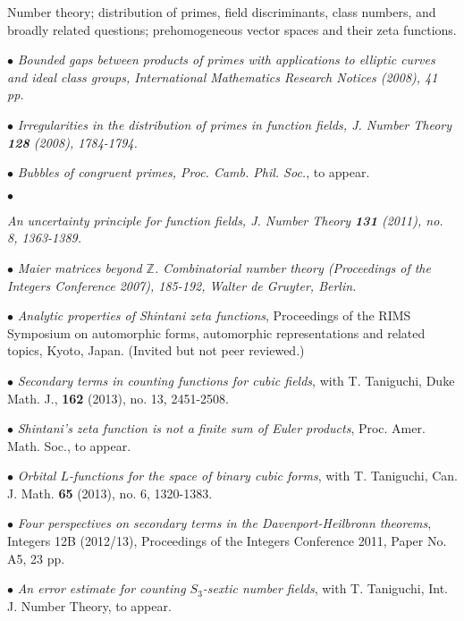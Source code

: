 \documentclass{article}
\newcommand{\categorywidth}{1in}        %
\newcommand{\infowidth}{5.8in}          %
\newcommand{\categorysep}{5pt}
\newcommand{\catlistlabel}[1]%
{\raisebox{0pt}[1ex][0pt]{\makebox[\labelwidth][l]%
    {\parbox[t]{\labelwidth}{\hspace{0pt}\textbf{#1}}}}}
\newenvironment{categories}{\begin{list}{}{
      \setlength{\labelwidth}{\categorywidth}
      \setlength{\leftmargin}{\labelwidth}
      \addtolength{\leftmargin}{\labelsep}
      \setlength{\topsep}{20pt}
      \setlength{\itemsep}{\categorysep}
      \renewcommand{\makelabel}{\catlistlabel}
      }}{\end{list}}
\newcommand{\category}[1]{\item[#1]}
\newcommand{\rawentry}[1]{{\begin{minipage}[t]{\infowidth}{#1}
    \end{minipage}}}
\begin{document}
\begin{flushleft}
\begin{categories}
  \rawentry{Number theory; distribution of primes, field discriminants, class numbers, 
  and broadly related questions; prehomogeneous vector spaces and their zeta functions. \\}





  \category{Research \\ Publications}

  $\bullet$ {\itshape Bounded gaps between products of primes with applications
to elliptic curves and ideal class groups\upshape, International Mathematics
Research Notices (2008), 41 pp.}

  $\bullet$ {\itshape Irregularities in the distribution of primes in function fields\upshape, 
   J. Number Theory \textbf{128} (2008), 1784-1794.}

  $\bullet$ {\itshape Bubbles of congruent primes\upshape,
  Proc. Camb. Phil. Soc.}, to appear.

  $\bullet$ {\itshape An uncertainty principle for function fields\upshape,
J. Number Theory \textbf{131} (2011), no. 8, 1363-1389. 

  $\bullet$ {\itshape Maier matrices beyond $\mathbb{Z}$\upshape.
Combinatorial number theory
(Proceedings of the Integers Conference 2007), 185-192, Walter de Gruyter, Berlin.}

  $\bullet$ {\itshape Analytic properties of Shintani zeta functions}, Proceedings
of the RIMS Symposium on automorphic forms, automorphic representations and related topics, Kyoto, Japan.
(Invited but not peer reviewed.)

  $\bullet$ {\itshape Secondary terms in counting functions for cubic fields}, with T. Taniguchi, Duke Math. J., 
\textbf{162} (2013), no. 13, 2451-2508.

  $\bullet$ {\itshape Shintani's zeta function is not a finite sum of Euler products},
Proc. Amer. Math. Soc., to appear.

  $\bullet$ {\itshape Orbital $L$-functions for the space of binary cubic forms}, with T. Taniguchi,
Can. J. Math. \textbf{65} (2013), no. 6, 1320-1383.

  $\bullet$ {\itshape Four perspectives on secondary terms in the Davenport-Heilbronn theorems}, Integers 12B
(2012/13),
Proceedings of the Integers Conference 2011, Paper No. A5, 23 pp.

  $\bullet$ {\itshape An error estimate for counting $S_3$-sextic number fields}, with T. Taniguchi, Int. J.
Number Theory, to appear.

}
\end{categories}
\end{flushleft}
\end{document}
